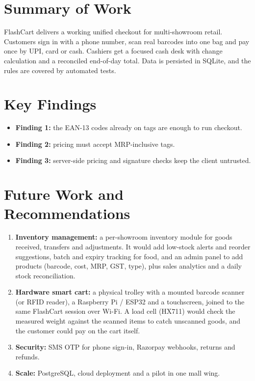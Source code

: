 \documentclass[12pt,letterpaper,twoside,openany]{report}
\begin{document}
\section{Summary of Work}
FlashCart delivers a working unified checkout for multi-showroom retail. Customers sign in
with a phone number, scan real barcodes into one bag and pay once by UPI, card or cash.
Cashiers get a focused cash desk with change calculation and a reconciled end-of-day total.
Data is persisted in SQLite, and the rules are covered by automated tests.

\section{Key Findings}
\begin{itemize}[leftmargin=*]
  \item \textbf{Finding 1:} the EAN-13 codes already on tags are enough to run checkout.
  \item \textbf{Finding 2:} pricing must accept MRP-inclusive tags.
  \item \textbf{Finding 3:} server-side pricing and signature checks keep the client untrusted.
\end{itemize}

\section{Future Work and Recommendations}
\begin{enumerate}[leftmargin=*]
  \item \textbf{Inventory management:} a per-showroom inventory module for goods received,
        transfers and adjustments. It would add low-stock alerts and reorder suggestions,
        batch and expiry tracking for food, and an admin panel to add products (barcode, cost,
        MRP, GST, type), plus sales analytics and a daily stock reconciliation.
  \item \textbf{Hardware smart cart:} a physical trolley with a mounted barcode scanner (or
        RFID reader), a Raspberry Pi / ESP32 and a touchscreen, joined to the same FlashCart
        session over Wi-Fi. A load cell (HX711) would check the measured weight against the
        scanned items to catch unscanned goods, and the customer could pay on the cart itself.
  \item \textbf{Security:} SMS OTP for phone sign-in, Razorpay webhooks, returns and refunds.
  \item \textbf{Scale:} PostgreSQL, cloud deployment and a pilot in one mall wing.
\end{enumerate}
\end{document}
